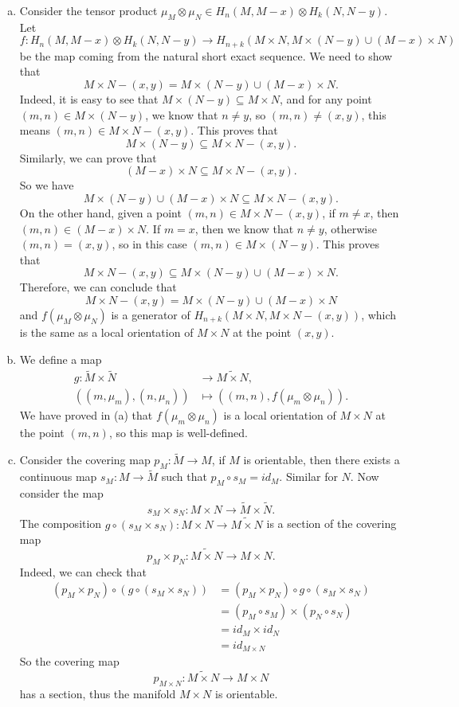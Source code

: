 \documentclass[letterpaper, 12pt]{article}
\begin{document}
\begin{solution}
\begin{enumerate}[(a)]
\item Consider the tensor product \(\mu_M\otimes \mu_N\in H_n(M,M-x)\otimes H_k(N,N-y)\). Let 
\[f:H_n(M,M-x)\otimes H_k(N,N-y)\rightarrow H_{n+k}(M\times N, M\times (N-y)\cup (M-x)\times N)\]
 be the map coming from the natural short exact sequence. We need to show that 
 \[M\times N-(x,y) =M\times (N-y)\cup (M-x)\times N.\]
Indeed, it is easy to see that \(M\times (N-y)\subseteq M\times N\), and for any point \((m,n)\in M\times (N-y)\), we know that \(n\neq y\), so \((m,n)\neq (x,y)\), this means \((m,n)\in M\times N-(x,y)\). This proves that 
\[M\times (N-y)\subseteq M\times N-(x,y).\]
Similarly, we can prove that 
\[(M-x)\times N\subseteq M\times N-(x,y).\]
So we have 
\[M\times (N-y)\cup (M-x)\times N\subseteq M\times N-(x,y).\]
On the other hand, given a point \((m,n)\in M\times N-(x,y)\), if \(m\neq x\), then \((m,n)\in (M-x)\times N\). If \(m=x\), then we know that \(n\neq y\), otherwise \((m,n)=(x,y)\), so in this case \((m,n)\in M\times (N-y)\). This proves that 
\[M\times N-(x,y)\subseteq M\times (N-y)\cup (M-x)\times N.\]
Therefore, we can conclude that 
\[M\times N-(x,y)=M\times (N-y)\cup (M-x)\times N\]
and \(f(\mu_M\otimes \mu_N)\) is a generator of \(H_{n+k}(M\times N,M\times N-(x,y))\), which is the same as a local orientation of \(M\times N\) at the point \((x,y)\).
\item We define a map 
\begin{align*}
    g:\tilde{M}\times\tilde{N}&\rightarrow \widetilde{M\times N},\\ 
      ((m,\mu_m),(n,\mu_n))&\mapsto ((m,n),f(\mu_m\otimes \mu_n)). 
\end{align*}
We have proved in (a) that \(f(\mu_m\otimes \mu_n)\) is a local orientation of \(M\times N\) at the point \((m,n)\), so this map is well-defined. 
\item Consider the covering map \(p_M:\tilde{M}\rightarrow M\), if \(M\) is orientable, then there exists a continuous map \(s_M:M\rightarrow \tilde{M}\) such that \(p_M\circ s_M=id_M\). Similar for \(N\). Now consider the map 
\[s_M\times s_N:M\times N\rightarrow \tilde{M}\times \tilde{N}.\]
The composition \(g\circ (s_M\times s_N): M\times N\rightarrow \tilde{M\times N}\) is a section of the covering map 
\[p_M\times p_N:\widetilde{M\times N}\rightarrow M\times N.\]
Indeed, we can check that 
\begin{align*}
    (p_M\times p_N)\circ (g\circ (s_M\times s_N))&=(p_M\times p_N)\circ g\circ (s_M\times s_N)\\ 
                                                 &=(p_M\circ s_M)\times (p_N\circ s_N)\\ 
                                                 &=id_M\times id_N\\ 
                                                 &=id_{M\times N}
\end{align*}
So the covering map 
\[p_{M\times N}:\widetilde{M\times N}\rightarrow M\times N\]
has a section, thus the manifold \(M\times N\) is orientable. 
\end{enumerate}
\end{solution}
\end{document}
